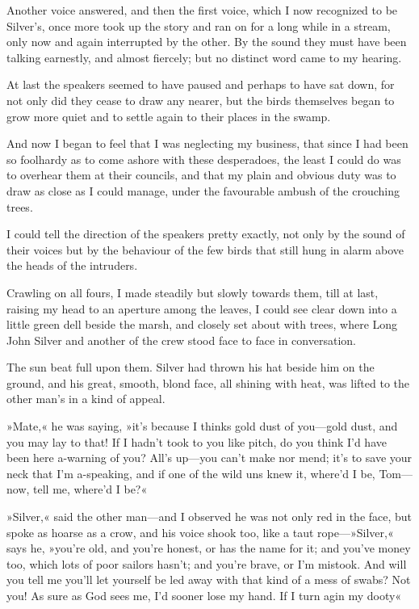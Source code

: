 Another voice answered, and then the first voice, which I now recognized to be Silver's, once more took up the story and ran on for a long while in a stream, only now and again interrupted by the other. By the sound they must have been talking earnestly, and almost fiercely; but no distinct word came to my hearing.

At last the speakers seemed to have paused and perhaps to have sat down, for not only did they cease to draw any nearer, but the birds themselves began to grow more quiet and to settle again to their places in the swamp.

And now I began to feel that I was neglecting my business, that since I had been so foolhardy as to come ashore with these desperadoes, the least I could do was to overhear them at their councils, and that my plain and obvious duty was to draw as close as I could manage, under the favourable ambush of the crouching trees.

I could tell the direction of the speakers pretty exactly, not only by the sound of their voices but by the behaviour of the few birds that still hung in alarm above the heads of the intruders.

Crawling on all fours, I made steadily but slowly towards them, till at last, raising my head to an aperture among the leaves, I could see clear down into a little green dell beside the marsh, and closely set about with trees, where Long John Silver and another of the crew stood face to face in conversation.

The sun beat full upon them. Silver had thrown his hat beside him on the ground, and his great, smooth, blond face, all shining with heat, was lifted to the other man's in a kind of appeal.

»Mate,« he was saying, »it's because I thinks gold dust of you—gold dust, and you may lay to that! If I hadn't took to you like pitch, do you think I'd have been here a-warning of you? All's up—you can't make nor mend; it's to save your neck that I'm a-speaking, and if one of the wild uns knew it, where'd I be, Tom—now, tell me, where'd I be?«

»Silver,« said the other man—and I observed he was not only red in the face, but spoke as hoarse as a crow, and his voice shook too, like a taut rope—»Silver,« says he, »you're old, and you're honest, or has the name for it; and you've money too, which lots of poor sailors hasn't; and you're brave, or I'm mistook. And will you tell me you'll let yourself be led away with that kind of a mess of swabs? Not you! As sure as God sees me, I'd sooner lose my hand. If I turn agin my dooty\longdash«

